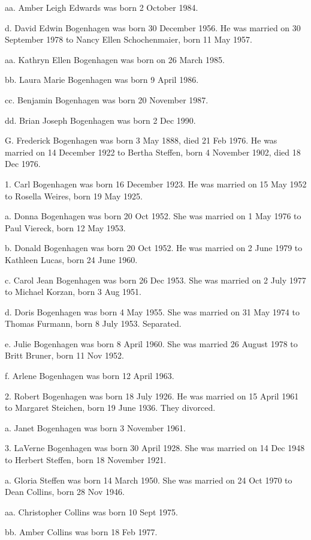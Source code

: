 \documentclass[a4paper]{article}
\begin{document}
aa. Amber Leigh Edwards was born 2 October 1984.

d. David Edwin Bogenhagen was born 30 December 1956.  He was married on 30 September 1978 to Nancy Ellen Schochenmaier, born 11 May 1957.

aa. Kathryn Ellen Bogenhagen was born on 26 March 1985.

bb. Laura Marie Bogenhagen was born 9 April 1986.

cc. Benjamin Bogenhagen was born 20 November 1987.

dd. Brian Joseph Bogenhagen was born 2 Dec 1990.

G. Frederick Bogenhagen was born 3 May 1888, died 21 Feb 1976.  He was married on 14 December 1922 to Bertha Steffen, born 4 November 1902, died 18 Dec 1976.

1. Carl Bogenhagen was born 16 December 1923.  He was married on 15 May 1952 to Rosella Weires, born 19 May 1925.

a. Donna Bogenhagen was born 20 Oct 1952.  She was married on 1 May 1976 to Paul Viereck, born 12 May 1953.
 
b. Donald Bogenhagen was born 20 Oct 1952.  He was married on 2 June 1979 to Kathleen Lucas, born 24 June 1960.
 
c. Carol Jean Bogenhagen was born 26 Dec 1953.  She was married on 2 July 1977 to Michael Korzan, born 3 Aug 1951.
 
d. Doris Bogenhagen was born 4 May 1955.  She was married on 31 May 1974 to Thomas Furmann, born 8 July 1953.  Separated.
 
e. Julie Bogenhagen was born 8 April 1960.  She was married 26 August 1978 to Britt Bruner, born 11 Nov 1952.
 
f. Arlene Bogenhagen was born 12 April 1963.

2. Robert Bogenhagen was born 18 July 1926.  He was married on 15 April 1961 to Margaret Steichen, born 19 June 1936.  They divorced.		
 
a. Janet Bogenhagen was born 3 November 1961.

3. LaVerne Bogenhagen was born 30 April 1928.  She was married on 14 Dec 1948 to Herbert Steffen, born 18 November 1921.
 
a. Gloria Steffen was born 14 March 1950.  She was married on 24 Oct 1970 to Dean Collins, born 28 Nov 1946.
 
aa. Christopher Collins was born 10 Sept 1975.

bb. Amber Collins was born 18 Feb 1977.
\end{document}
